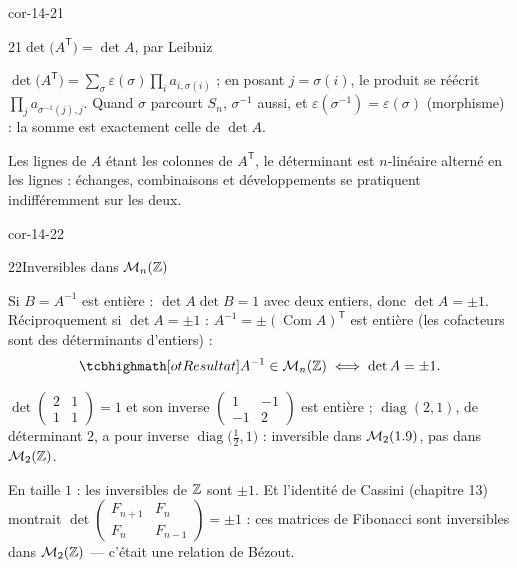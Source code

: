 \begin{blocLivre}{cor-14-21}
\begin{corrige}{21}{$\det\bigl(A^{\mathsf T}\bigr)=\det A$, par Leibniz}
\begin{questions}
  \item $\det\bigl(A^{\mathsf T}\bigr)
    =\sum_{\sigma}\varepsilon(\sigma)\prod_i a_{i,\sigma(i)}$ ; en posant
    $j=\sigma(i)$, le produit se réécrit
    $\prod_j a_{\sigma^{-1}(j),j}$. Quand $\sigma$ parcourt $S_n$,
    $\sigma^{-1}$ aussi, et
    $\varepsilon(\sigma^{-1})=\varepsilon(\sigma)$ (morphisme) : la somme
    est exactement celle de $\det A$.
  \item Les lignes de $A$ étant les colonnes de $A^{\mathsf T}$, le
    déterminant est $n$-linéaire alterné en les lignes : échanges,
    combinaisons et développements se pratiquent indifféremment sur les
    deux.
\end{questions}
\end{corrige}
\end{blocLivre}

\begin{blocLivre}{cor-14-22}
\begin{corrige}{22}{Inversibles dans $\mathcal{M}_n(\mathbb{Z})$}
\begin{questions}
  \item Si $B=A^{-1}$ est entière : $\det A\det B=1$ avec deux entiers,
    donc $\det A=\pm1$. Réciproquement si $\det A=\pm1$ :
    $A^{-1}=\pm(\operatorname{Com}A)^{\mathsf T}$ est entière (les
    cofacteurs sont des déterminants d'entiers) :
    \[
    \res{A^{-1}\in\mathcal{M}_n(\Z)\iff\det A=\pm1}.
    \]
  \item $\det\begin{pmatrix}2&1\\1&1\end{pmatrix}=1$ et son inverse
    $\begin{pmatrix}1&-1\\-1&2\end{pmatrix}$ est entière ;
    $\operatorname{diag}(2,1)$, de déterminant $2$, a pour inverse
    $\operatorname{diag}\bigl(\tfrac12,1\bigr)$ : inversible dans
    $\mathcal{M}_2(1.9)$, pas dans $\mathcal{M}_2(\mathbb{Z})$.
  \item En taille $1$ : les inversibles de $\mathbb{Z}$ sont $\pm1$. Et
    l'identité de Cassini (chapitre 13) montrait
    $\det\begin{pmatrix}F_{n+1}&F_n\\F_n&F_{n-1}\end{pmatrix}=\pm1$ :
    ces matrices de Fibonacci sont inversibles dans $\mathcal{M}_2(\mathbb{Z})$ —
    c'était une relation de Bézout.
\end{questions}
\end{corrige}
\end{blocLivre}

